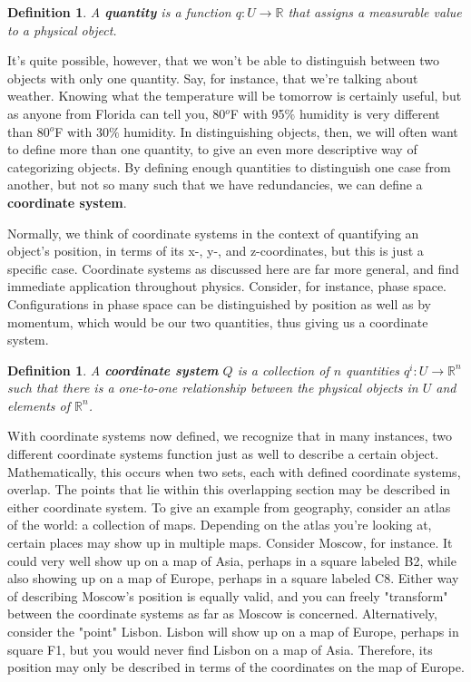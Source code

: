 \documentclass{book}
\newtheorem{defn}[equation]{Definition}
\begin{document}
\begin{defn}
	A \textbf{quantity} is a function $q : U \to \mathbb{R}$ that assigns a measurable value to a physical object.
\end{defn}



It's quite possible, however, that we won't be able to distinguish between two objects with only one quantity. Say, for instance, that we're talking about weather. Knowing what the temperature will be tomorrow is certainly useful, but as anyone from Florida can tell you, 80$^o$F with 95$\%$ humidity is very different than 80$^o$F with 30$\%$ humidity. In distinguishing objects, then, we will often want to define more than one quantity, to give an even more descriptive way of categorizing objects. By defining enough quantities to distinguish one case from another, but not so many such that we have redundancies, we can define a \textbf{coordinate system}.


Normally, we think of coordinate systems in the context of quantifying an object's position, in terms of its x-, y-, and z-coordinates, but this is just a specific case. Coordinate systems as discussed here are far more general, and find immediate application throughout physics. Consider, for instance, phase space. Configurations in phase space can be distinguished by position as well as by momentum, which would be our two quantities, thus giving us a coordinate system. 

\begin{defn}
	A \textbf{coordinate system} $Q$ is a collection of $n$ quantities $q^i : U \to \mathbb{R}^n$ such that there is a one-to-one relationship between the physical objects in $U$ and elements of $\mathbb{R}^n$.
\end{defn}






With coordinate systems now defined, we recognize that in many instances, two different coordinate systems function just as well to describe a certain object. Mathematically, this occurs when two sets, each with defined coordinate systems, overlap. The points that lie within this overlapping section may be described in either coordinate system. To give an example from geography, consider an atlas of the world: a collection of maps. Depending on the atlas you're looking at, certain places may show up in multiple maps. Consider Moscow, for instance. It could very well show up on a map of Asia, perhaps in a square labeled B2, while also showing up on a map of Europe, perhaps in a square labeled C8. Either way of describing Moscow's position is equally valid, and you can freely "transform" between the coordinate systems as far as Moscow is concerned. Alternatively, consider the "point" Lisbon. Lisbon will show up on a map of Europe, perhaps in square F1, but you would never find Lisbon on a map of Asia. Therefore, its position may only be described in terms of the coordinates on the map of Europe.
\end{document}
